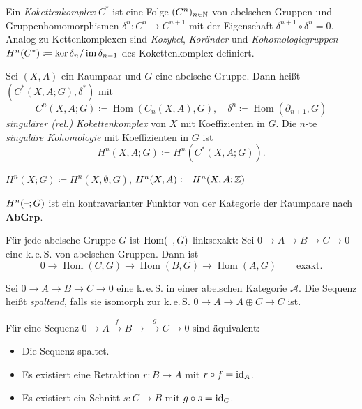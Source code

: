 \documentclass{cheat-sheet}
\newcommand{\AbGrp}{\mathbf{AbGrp}} %
\DeclareMathOperator{\Hom}{Hom} %
\newcommand{\keS}{k.\,e.\,S.} %
\newcommand{\inlineitem}[1]{\textbullet \enspace #1} %
\begin{document}


\begin{defn}
  Ein \emph{Kokettenkomplex} $C^*$ ist eine Folge $(C^n)_{n \in \mathbb{N}}$ von abelschen Gruppen und Gruppenhomomorphismen $\delta^n : C^n \to C^{n+1}$ mit der Eigenschaft $\delta^{n+1} \circ \delta^n = 0$. Analog zu Kettenkomplexen sind \emph{Kozykel}, \emph{Koränder} und \emph{Kohomologiegruppen} $H^n(C^*) \coloneqq \ker \delta_n / \mathop{\mathrm{im}} \delta_{n-1}$ des Kokettenkomplex definiert.
\end{defn}

\begin{defn}
  Sei $(X, A)$ ein Raumpaar und $G$ eine abelsche Gruppe. Dann heißt $(C^*(X, A; G), \delta^*)$ mit
  \[
    C^n(X, A; G) \coloneqq \Hom(C_n(X, A), G), \quad
    \delta^n \coloneqq \Hom(\partial_{n+1}, G)
  \]
  \emph{singulärer (rel.) Kokettenkomplex} von $X$ mit Koeffizienten in $G$. Die $n$-te \emph{singuläre Kohomologie} mit Koeffizienten in $G$ ist
  \[ H^n(X, A; G) \coloneqq H^n(C^*(X, A; G)). \]
\end{defn}

\begin{nota}
  \inlineitem{$H^n(X; G) \coloneqq H^n(X, \emptyset; G)$,} \quad
  \inlineitem{$H^n(X, A) \coloneqq H^n(X, A; \mathbb{Z})$}
\end{nota}

\begin{bem}
  $H^n(\text{--}; G)$ ist ein kontravarianter Funktor von der Kategorie der Raumpaare nach $\AbGrp$.
\end{bem}

\begin{lem}
  Für jede abelsche Gruppe $G$ ist $\Hom(\blank, G)$ linksexakt:
  Sei $0 \to A \to B \to C \to 0$ eine \keS{} von abelschen Gruppen. Dann ist
  \[
    0 \to \Hom(C, G) \to \Hom(B, G) \to \Hom(A, G)
    \qquad \text{exakt.}
  \]
\end{lem}

\begin{defn}
  Sei $0 \to A \to B \to C \to 0$ eine \keS{} in einer abelschen Kategorie $\mathcal{A}$. Die Sequenz heißt \emph{spaltend}, falls sie isomorph zur \keS{} $0 \to A \to A \oplus C \to C$ ist.
\end{defn}

\begin{prop}
  Für eine Sequenz $0 \to A \xrightarrow{f} B \to \xrightarrow{g} C \to 0$ sind äquivalent:
  \begin{itemize}
    \item Die Sequenz spaltet.
    \item Es existiert eine Retraktion $r : B \to A$ mit $r \circ f = \mathrm{id}_A$.
    \item Es existiert ein Schnitt $s : C \to B$ mit $g \circ s = \mathrm{id}_C$.
  \end{itemize}
\end{prop}
\end{document}
